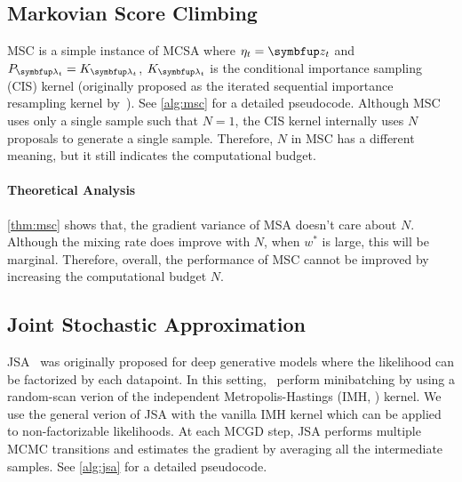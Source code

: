 \subsection{Markovian Score Climbing}
\vspace{-0.1in}
MSC is a simple instance of MCSA where \(\eta_t = \vz_t\) and \(P_{\vlambda_t} = K_{\vlambda_t}\), \(K_{\vlambda_t}\) is the conditional importance sampling (CIS) kernel (originally proposed as the iterated sequential importance resampling kernel by~\citet{andrieu_uniform_2018}).
See \cref{alg:msc} for a detailed pseudocode.
Although MSC uses only a single sample such that \(N=1\), the CIS kernel internally uses \(N\) proposals to generate a single sample.
Therefore, \(N\) in MSC has a different meaning, but it still indicates the computational budget.




\paragraph{Theoretical Analysis}
\cref{thm:msc} shows that, the gradient variance of MSA doesn't care about \(N\).
Although the mixing rate does improve with \(N\), when \(w^*\) is large, this will be marginal.
Therefore, overall, the performance of MSC cannot be improved by increasing the computational budget \(N\).

\vspace{-0.05in}
\subsection{Joint Stochastic Approximation}
\vspace{-0.1in}
JSA~\citep{pmlr-v124-ou20a} was originally proposed for deep generative models where the likelihood can be factorized by each datapoint.
In this setting,~\citeauthor{pmlr-v124-ou20a} perform minibatching by using a random-scan verion of the independent Metropolis-Hastings (IMH, \citealt{hastings_monte_1970,robert_monte_2004}) kernel.
We use the general verion of JSA with the vanilla IMH kernel which can be applied to non-factorizable likelihoods.
At each MCGD step, JSA performs multiple MCMC transitions and estimates the gradient by averaging all the intermediate samples.
See \cref{alg:jsa} for a detailed pseudocode.

\vspace{-0.1in}
